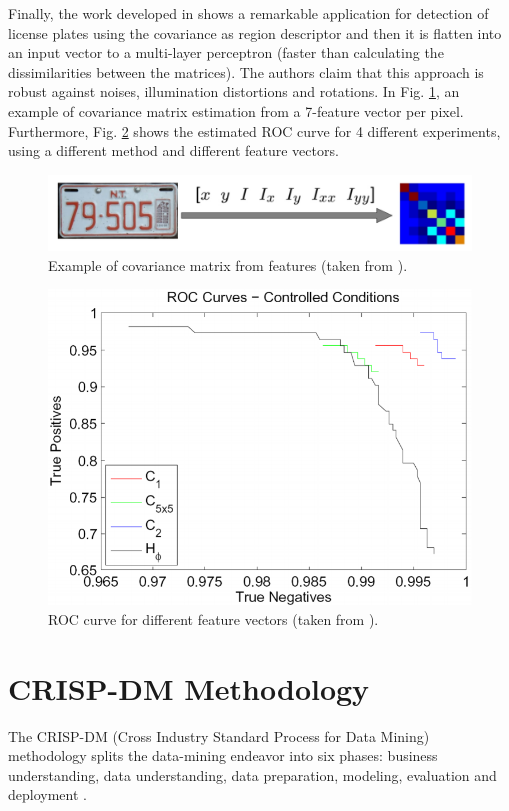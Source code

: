\documentclass[11pt]{article}
\theoremstyle{definition}
\theoremstyle{remark}
\theoremstyle{remark}
\theoremstyle{remark}
\begin{document}
Finally, the work developed in \parencite{porikli2006robust} shows a remarkable
application for detection of license plates using the covariance as region
descriptor and then it is flatten into an input vector to a multi-layer
perceptron (faster than calculating the dissimilarities between the matrices).
The authors claim that this approach is robust against noises, illumination
distortions and rotations. In Fig. \ref{fig:plate}, an example of covariance
matrix estimation from a 7-feature vector per pixel. Furthermore, Fig.
\ref{fig:roc} shows the estimated ROC curve for 4 different experiments, using a
different method and different feature vectors.

\begin{figure}[H]
  \centering \includegraphics[scale=0.2]{plate.png}
  \caption{Example of covariance matrix from features (taken from
    \parencite{porikli2006robust}).}
  \label{fig:plate}
\end{figure}

\begin{figure}[H]
  \centering \includegraphics[scale=0.3]{roc.png}
  \caption{ROC curve for different feature vectors (taken from
    \parencite{porikli2006robust}).}
  \label{fig:roc}
\end{figure}

\section{CRISP-DM Methodology}\label{sec:crisp}
The CRISP-DM (Cross Industry Standard Process for Data Mining) methodology
splits the data-mining endeavor into six phases: business understanding, data
understanding, data preparation, modeling, evaluation and deployment
\cite{Chapman2000CRISPDM1S}.
\end{document}
